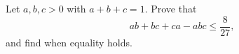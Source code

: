Let $a,b,c>0$ with $a+b+c=1$. Prove that
\[
ab+bc+ca-abc\le\dfrac{8}{27},
\]
and find when equality holds.
